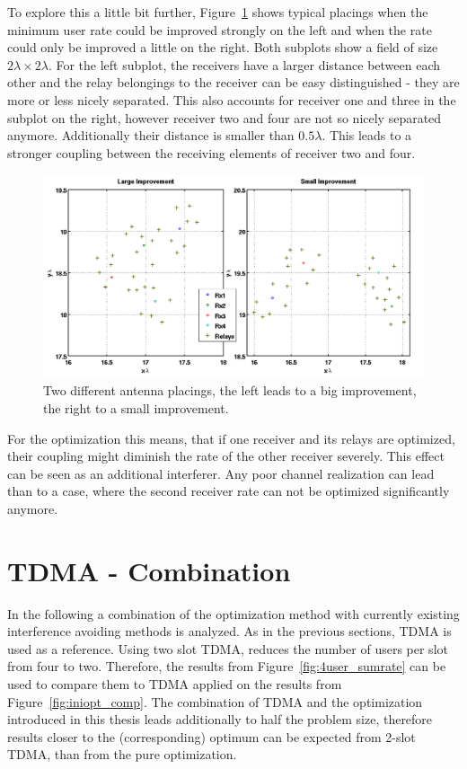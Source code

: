 To explore this a little bit further, Figure~\ref{fig:4user_placing} shows typical placings when the minimum user rate could be improved strongly on the left and when the rate could only be improved a little on the right.
Both subplots show a field of size $2\lambda \times 2\lambda$.
For the left subplot, the receivers have a larger distance between each other and the relay belongings to the receiver can be easy distinguished - they are more or less nicely separated.
This also accounts for receiver one and three in the subplot on the right, however receiver two and four are not so nicely separated anymore.
Additionally their distance is smaller than $0.5\lambda$.
This leads to a stronger coupling between the receiving elements of receiver two and four.
\begin{figure}[h]
\centering
  \includegraphics[width=0.95\linewidth]{images/Antenna_placing_4user.png}
\caption{Two different antenna placings, the left leads to a big improvement, the right to a small improvement.}
\label{fig:4user_placing}
\end{figure}

For the optimization this means, that if one receiver and its relays are optimized, their coupling might diminish the rate of the other receiver severely.
This effect can be seen as an additional interferer.
Any poor channel realization can lead than to a case, where the second receiver rate can not be optimized significantly anymore.


\section{TDMA - Combination}
\label{sec:tdma_combination}

In the following a combination of the optimization method with currently existing interference avoiding methods is analyzed.
As in the previous sections, TDMA is used as a reference.
Using two slot TDMA, reduces the number of users per slot from four to two.
Therefore, the results from Figure~\ref{fig:4user_sumrate} can be used to compare them to TDMA applied on the results from Figure~\ref{fig:iniopt_comp}.
The combination of TDMA and the optimization introduced in this thesis leads additionally to half the problem size, therefore results closer to the (corresponding) optimum can be expected from 2-slot TDMA, than from the pure optimization.

